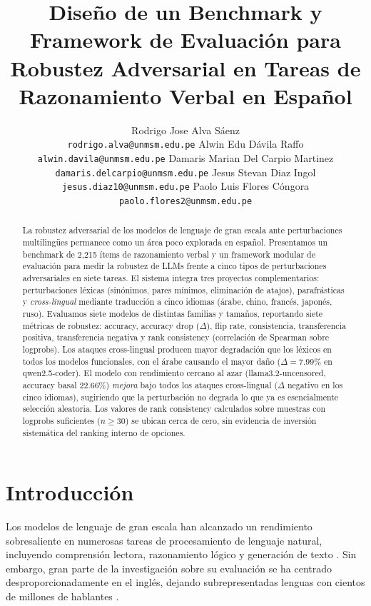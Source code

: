 \documentclass[11pt]{article}
\title{Diseño de un Benchmark y Framework de Evaluación para Robustez Adversarial en Tareas de Razonamiento Verbal en Español}
\author{
    Rodrigo Jose Alva Sáenz \\ \texttt{\small rodrigo.alva@unmsm.edu.pe} \And
    Alwin Edu Dávila Raffo \\ \texttt{\small alwin.davila@unmsm.edu.pe} \AND
    Damaris Marian Del Carpio Martinez \\ \texttt{\small damaris.delcarpio@unmsm.edu.pe} \And
    Jesus Stevan Diaz Ingol \\ \texttt{\small jesus.diaz10@unmsm.edu.pe} \AND
    Paolo Luis Flores Cóngora \\ \texttt{\small paolo.flores2@unmsm.edu.pe}
}
\begin{document}
\maketitle

\begin{abstract}
La robustez adversarial de los modelos de lenguaje de gran escala ante
perturbaciones multilingües permanece como un área poco explorada en
español. Presentamos un benchmark de 2{,}215 ítems de razonamiento
verbal y un framework modular de evaluación para medir la robustez de
LLMs frente a cinco tipos de perturbaciones adversariales en siete
tareas. El sistema integra tres proyectos complementarios:
perturbaciones léxicas (sinónimos, pares mínimos, eliminación de
atajos), parafrásticas y \textit{cross-lingual} mediante traducción a
cinco idiomas (árabe, chino, francés, japonés, ruso). Evaluamos siete
modelos de distintas familias y tamaños, reportando siete métricas de
robustez: accuracy, accuracy drop ($\Delta$), flip rate, consistencia,
transferencia positiva, transferencia negativa y rank consistency
(correlación de Spearman sobre logprobs). Los ataques cross-lingual
producen mayor degradación que los léxicos en todos los modelos
funcionales, con el árabe causando el mayor daño ($\Delta = 7.99\%$
en qwen2.5-coder). El modelo con rendimiento cercano al azar
(llama3.2-uncensored, accuracy basal 22.66\%) \textit{mejora} bajo
todos los ataques cross-lingual ($\Delta$ negativo en los cinco
idiomas), sugiriendo que la perturbación no degrada lo que ya es
esencialmente selección aleatoria. Los valores de rank consistency
calculados sobre muestras con logprobs suficientes ($n \geq 30$) se
ubican cerca de cero, sin evidencia de inversión sistemática del
ranking interno de opciones.
\end{abstract}

\section{Introducción}

Los modelos de lenguaje de gran escala han alcanzado un rendimiento
sobresaliente en numerosas tareas de procesamiento de lenguaje natural,
incluyendo comprensión lectora, razonamiento lógico y generación de
texto \citep{brown2020language, wei2022emergent}. Sin embargo, gran
parte de la investigación sobre su evaluación se ha centrado
desproporcionadamente en el inglés, dejando subrepresentadas lenguas
con cientos de millones de hablantes \citep{multilingual2023}.
 
\end{document}
